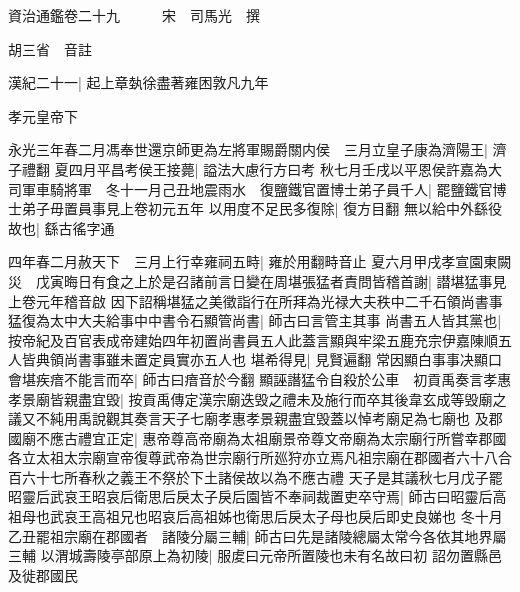 






























































資治通鑑卷二十九　　　宋　司馬光　撰

胡三省　音註

漢紀二十一|{
	起上章埶徐盡著雍困敦凡九年}


孝元皇帝下

永光三年春二月馮奉世還京師更為左將軍賜爵關内侯　三月立皇子康為濟陽王|{
	濟子禮翻}
夏四月平昌考侯王接薨|{
	謚法大慮行方曰考}
秋七月壬戌以平恩侯許嘉為大司軍車騎將軍　冬十一月己丑地震雨水　復鹽鐵官置博士弟子員千人|{
	罷鹽鐵官博士弟子毋置員事見上卷初元五年}
以用度不足民多復除|{
	復方目翻}
無以給中外繇役故也|{
	繇古徭字通}


四年春二月赦天下　三月上行幸雍祠五畤|{
	雍於用翻畤音止}
夏六月甲戌孝宣園東闕災　戊寅晦日有食之上於是召諸前言日變在周堪張猛者責問皆稽首謝|{
	譛堪猛事見上卷元年稽音啟}
因下詔稱堪猛之美徵詣行在所拜為光禄大夫秩中二千石領尚書事猛復為太中大夫給事中中書令石顯管尚書|{
	師古曰言管主其事}
尚書五人皆其黨也|{
	按帝紀及百官表成帝建始四年初置尚書員五人此蓋言顯與牢梁五鹿充宗伊嘉陳順五人皆典領尚書事雖未置定員實亦五人也}
堪希得見|{
	見賢遍翻}
常因顯白事事决顯口會堪疾瘖不能言而卒|{
	師古曰瘖音於今翻}
顯誣譖猛令自殺於公車　初貢禹奏言孝惠孝景廟皆親盡宜毁|{
	按貢禹傳定漢宗廟迭毁之禮未及施行而卒其後韋玄成等毁廟之議又不純用禹說觀其奏言天子七廟孝惠孝景親盡宜毁蓋以悼考廟足為七廟也}
及郡國廟不應古禮宜正定|{
	惠帝尊高帝廟為太祖廟景帝尊文帝廟為太宗廟行所嘗幸郡國各立太祖太宗廟宣帝復尊武帝為世宗廟行所廵狩亦立焉凡祖宗廟在郡國者六十八合百六十七所春秋之義王不祭於下土諸侯故以為不應古禮}
天子是其議秋七月戊子罷昭靈后武哀王昭哀后衛思后戾太子戾后園皆不奉祠裁置吏卒守焉|{
	師古曰昭靈后高祖母也武哀王高祖兄也昭哀后高祖姊也衛思后戾太子母也戾后即史良娣也}
冬十月乙丑罷祖宗廟在郡國者　諸陵分屬三輔|{
	師古曰先是諸陵總屬太常今各依其地界屬三輔}
以渭城壽陵亭部原上為初陵|{
	服䖍曰元帝所置陵也未有名故曰初}
詔勿置縣邑及徙郡國民

